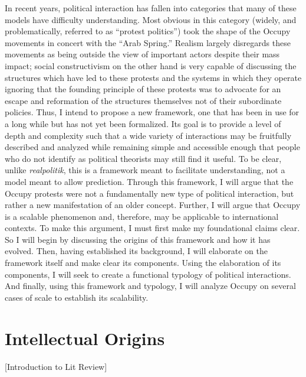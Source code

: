 \documentclass{article}
\begin{document}
In recent years, political interaction has fallen into categories that many of these models have difficulty understanding. 
Most obvious in this category (widely, and problematically, referred to as ``protest politics'') took the shape of the Occupy movements in concert with the ``Arab Spring.'' 
Realism largely disregards these movements as being outside the view of important actors despite their mass impact; social constructivism on the other hand is very capable of discussing the structures which have led to these protests and the systems in which they operate ignoring that the founding principle of these protests was to advocate for an escape and reformation of the structures themselves not of their subordinate policies. 
Thus, I intend to propose a new framework, one that has been in use for a long while but has not yet been formalized. 
Its goal is to provide a level of depth and complexity such that a wide variety of interactions may be fruitfully described and analyzed while remaining simple and accessible enough that people who do not identify as political theorists may still find it useful. 
To be clear, unlike \textit{realpolitik}, this is a framework meant to facilitate understanding, not a model meant to allow prediction. 
Through this framework, I will argue that the Occupy protests were not a fundamentally new type of political interaction, but rather a new manifestation of an older concept. 
Further, I will argue that Occupy is a scalable phenomenon and, therefore, may be applicable to international contexts. 
To make this argument, I must first make my foundational claims clear. 
So I will begin by discussing the origins of this framework and how it has evolved. 
Then, having established its background, I will elaborate on the framework itself and make clear its components. 
Using the elaboration of its components, I will seek to create a functional typology of political interactions. 
And finally, using this framework and typology, I will analyze Occupy on several cases of scale to establish its scalability.

\section{Intellectual Origins}
[Introduction to Lit Review]
\end{document}
